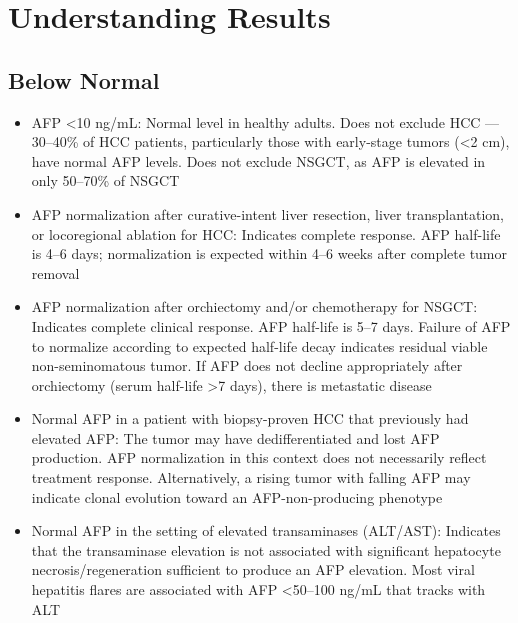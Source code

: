\section*{Understanding Results}

\subsection*{Below Normal}
\begin{itemize}
  \item AFP <10 ng/mL: Normal level in healthy adults. Does not exclude HCC --- 30--40\% of HCC patients, particularly those with early-stage tumors (<2 cm), have normal AFP levels. Does not exclude NSGCT, as AFP is elevated in only 50--70\% of NSGCT
  \item AFP normalization after curative-intent liver resection, liver transplantation, or locoregional ablation for HCC: Indicates complete response. AFP half-life is 4--6 days; normalization is expected within 4--6 weeks after complete tumor removal
  \item AFP normalization after orchiectomy and/or chemotherapy for NSGCT: Indicates complete clinical response. AFP half-life is 5--7 days. Failure of AFP to normalize according to expected half-life decay indicates residual viable non-seminomatous tumor. If AFP does not decline appropriately after orchiectomy (serum half-life >7 days), there is metastatic disease
  \item Normal AFP in a patient with biopsy-proven HCC that previously had elevated AFP: The tumor may have dedifferentiated and lost AFP production. AFP normalization in this context does not necessarily reflect treatment response. Alternatively, a rising tumor with falling AFP may indicate clonal evolution toward an AFP-non-producing phenotype
  \item Normal AFP in the setting of elevated transaminases (ALT/AST): Indicates that the transaminase elevation is not associated with significant hepatocyte necrosis/regeneration sufficient to produce an AFP elevation. Most viral hepatitis flares are associated with AFP <50--100 ng/mL that tracks with ALT
\end{itemize}

